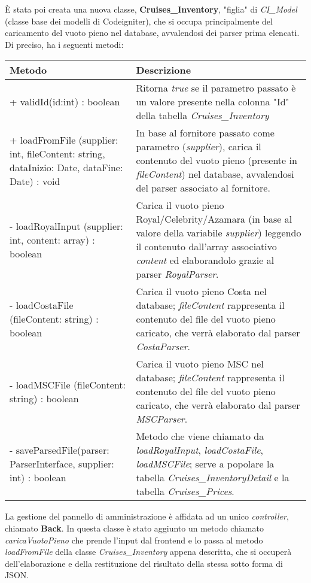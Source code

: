 È stata poi creata una nuova classe, \textbf{Cruises\_Inventory}, "figlia" di \textit{CI\_Model} (classe base dei modelli di Codeigniter), che si occupa principalmente del caricamento del vuoto pieno nel database, avvalendosi dei parser prima elencati. Di preciso, ha i seguenti metodi:
\begin{center}
	\def\arraystretch{1.5}
	\begin{longtable}{ >{\raggedright}p{5.5cm} p{6.8cm}} 
		\hline
		\textbf{Metodo} & \textbf{Descrizione} \\ \hline
		+ validId(id:int) : boolean & Ritorna \textit{true} se il parametro passato è un valore presente nella colonna "Id" della tabella \textit{Cruises\_Inventory}\\
		\hline
		+ loadFromFile (supplier: int, fileContent: string, dataInizio: Date, dataFine: Date) : void & In base al fornitore passato come parametro (\textit{supplier}), carica il contenuto del vuoto pieno (presente in \textit{fileContent}) nel database, avvalendosi del parser associato al fornitore.\\
		\hline
		- loadRoyalInput (supplier: int, content: array) : boolean & Carica il vuoto pieno Royal/Celebrity/Azamara (in base al valore della variabile \textit{supplier}) leggendo il contenuto dall'array associativo \textit{content} ed elaborandolo grazie al parser \textit{RoyalParser}.\\
		\hline
		- loadCostaFile (fileContent: string) : boolean & Carica il vuoto pieno Costa nel database; \textit{fileContent} rappresenta il contenuto del file del vuoto pieno caricato, che verrà elaborato dal parser \textit{CostaParser}.\\
		\hline
		- loadMSCFile (fileContent: string) : boolean & Carica il vuoto pieno MSC nel database; \textit{fileContent} rappresenta il contenuto del file del vuoto pieno caricato, che verrà elaborato dal parser \textit{MSCParser}.\\
		\hline
		- saveParsedFile(parser: ParserInterface, supplier: int) : boolean & Metodo che viene chiamato da \textit{loadRoyalInput}, \textit{loadCostaFile}, \textit{loadMSCFile}; serve a popolare la tabella \textit{Cruises\_InventoryDetail} e la tabella \textit{Cruises\_Prices}.\\
		\hline
	\end{longtable}
\end{center}
La gestione del pannello di amministrazione è affidata ad un unico \textit{controller}, chiamato \textbf{Back}. In questa classe è stato aggiunto un metodo chiamato \textit{caricaVuotoPieno} che prende l'input dal frontend e lo passa al metodo \textit{loadFromFile} della classe \textit{Cruises\_Inventory} appena descritta, che si occuperà dell'elaborazione e della restituzione del risultato della stessa sotto forma di JSON.

